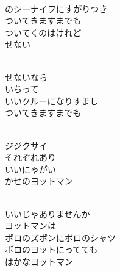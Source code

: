 \documentclass[10pt,b5j]{tarticle} %
\begin{document}
\vspace{1.5em} %
\newcommand{\linespace}{0.5em} %
\newcommand{\blocksize}{0.5\hsize} %
\newcommand{\itemmargin}{6em} %
\begin{enumerate} %
    \setlength{\itemindent}{\itemmargin} %
    \begin{minipage}[c]{\blocksize}
    
        \vspace{\linespace}
        \item~\\
        のシーナイフにすがりつき\\
        ついてきますまでも\\
        ついてくのはけれど\\
        せない
        
        \vspace{\linespace}
        \item~\\
        せないなら\\
        いちって\\
        いいクルーになりすまし\\
        ついてきますまでも
        
        \vspace{\linespace}
        \item~\\
        ジジクサイ\\
        それぞれあり\\
        いいにゃがい\\
        かせのヨットマン
        
        \vspace{\linespace}
        \item~\\
        いいじゃありませんか\\
        ヨットマンは\\
        ボロのズボンにボロのシャツ\\
        ボロのヨットにってても\\
        はかなヨットマン
        

\end{minipage}
\end{enumerate}
\end{document}
